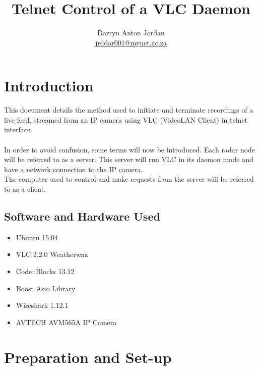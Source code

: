 \documentclass[a4paper,11pt]{report}
\title{Telnet Control of a VLC Daemon}
\author{Darryn Anton Jordan \\\href{mailto:jrddar001@myuct.ac.za}{jrddar001@myuct.ac.za}}
\begin{document}
\maketitle
\tableofcontents


\newpage

\section{Introduction}
This document details the method used to initiate and terminate recordings of a live feed, streamed from an IP camera using VLC (VideoLAN Client) in telnet interface.\\\\
In order to avoid confusion, some terms will now be introduced. Each radar node will be referred to as a server. This server will run VLC in its daemon mode and have a network connection to the IP camera.\\
The computer used to control and make requests from the server will be referred to as a client.

\subsection{Software and Hardware Used}
\begin{itemize}
  \item Ubuntu 15.04
  \item VLC 2.2.0 Weatherwax
  \item Code::Blocks 13.12
  \item Boost Asio Library
  \item Wireshark 1.12.1 
  \item AVTECH AVM565A IP Camera
\end{itemize}

\newpage

\section{Preparation and Set-up}
\end{document}
